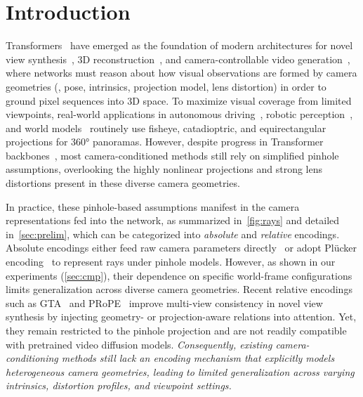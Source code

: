 \section{Introduction}
\label{sec:intro}

Transformers~\cite{vaswani2017attention} have emerged as the foundation of modern architectures for novel view synthesis~\cite{jinlvsm}, 3D reconstruction~\cite{jiang2025rayzer}, and camera-controllable video generation~\cite{bahmani2025ac3d,he2024cameractrl,cheong2024boosting}, where networks must reason about how visual observations are formed by camera geometries (\eg, pose, intrinsics, projection model, lens distortion) in order to ground pixel sequences into 3D space.
To maximize visual coverage from limited viewpoints, real-world applications in autonomous driving~\cite{yogamani2019woodscape,kumar2020fisheyedistancenet}, robotic perception~\cite{mei2006calibration,nayar1997catadioptric,zhang2016benefit}, and world models~\cite{team2025hunyuanworld,bar2025navigation,yang2025matrix} routinely use fisheye, catadioptric, and equirectangular projections for 360° panoramas.
However, despite progress in Transformer backbones~\cite{jinlvsm,jiang2025rayzer,wan2025wan,yang2025cogvideox}, most camera-conditioned methods still rely on simplified pinhole assumptions, overlooking the highly nonlinear projections and strong lens distortions present in these diverse camera geometries.





In practice, these pinhole-based assumptions manifest in the camera representations fed into the network, as summarized in~\cref{fig:rays} and detailed in~\cref{sec:prelim}, which can be categorized into \emph{absolute} and \emph{relative} encodings.
Absolute encodings either feed raw camera parameters directly~\cite{bai2025recammaster,wang2024motionctrl} or adopt Pl\"ucker encoding~\cite{bahmani2025ac3d,he2024cameractrl} to represent rays under pinhole models.
However, as shown in our experiments (\cref{sec:cmp}), their dependence on specific world-frame configurations limits generalization across diverse camera geometries.
Recent relative encodings such as GTA~\cite{miyato2023gta} and PRoPE~\cite{li2025cameras} improve multi-view consistency in novel view synthesis by injecting geometry- or projection-aware relations into attention.
Yet, they remain restricted to the pinhole projection and are not readily compatible with pretrained video diffusion models.
\textit{Consequently, existing camera-conditioning methods still lack an encoding mechanism that explicitly models heterogeneous camera geometries, leading to limited generalization across varying intrinsics, distortion profiles, and viewpoint settings.}


